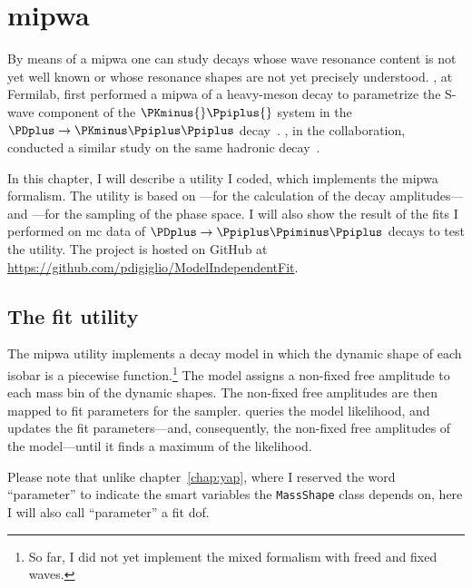 \chapter{\texorpdfstring{\Acl{mipwa}}{Model-independent PWA}}
\label{chap:model_independent_pwa}

By means of a \acf{mipwa} one can study decays whose wave resonance content is not yet well known or whose resonance shapes are not yet precisely understood.
\citeauthor{PhysRevD.73.032004}, at Fermilab, first performed a \ac{mipwa} of a heavy-meson decay to parametrize the S-wave component of the $\PKminus{}\Ppiplus{}$ system in the $\PDplus\to\PKminus\Ppiplus\Ppiplus$ decay~\cite{PhysRevD.73.032004}.
\citeauthor{Link200914}, in the \focus{} collaboration, conducted a similar study on the same hadronic decay~\cite{Link200914}.


In this chapter, I will describe a utility I coded, which implements the \ac{mipwa} formalism.
The utility is based on ---for the calculation of the decay amplitudes---and ---for the sampling of the phase space.
I will also show the result of the fits I performed on \ac{mc} data of $\PDplus\to\Ppiplus\Ppiminus\Ppiplus$ decays to test the utility.
The project is hosted on \textsf{GitHub} at \url{https://github.com/pdigiglio/ModelIndependentFit}.


    \section{The fit utility}

    The \ac{mipwa} utility implements a  decay model in which the dynamic shape of each isobar is a piecewise function.\footnote{So far, I did not yet implement the mixed formalism with freed and fixed waves.}
    The model assigns a non-fixed free amplitude to each mass bin of the dynamic shapes.
    The non-fixed free amplitudes are then mapped to fit parameters for the  sampler.
     queries the model likelihood, and updates the fit parameters---and, consequently, the non-fixed free amplitudes of the  model---until it finds a maximum of the likelihood.


    Please note that unlike chapter~\ref{chap:yap}, where I reserved the word ``parameter'' to indicate the smart variables the \lstinline!MassShape! class depends on, here I will also call ``parameter'' a fit \ac{dof}.

